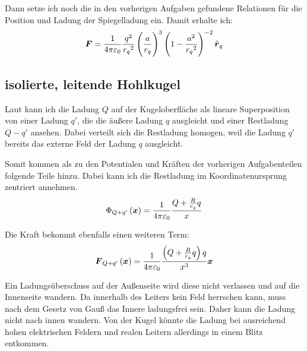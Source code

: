 \documentclass[11pt, ngerman, fleqn]{article}
\renewcommand{\vec}[1]{\boldsymbol{#1}}
\begin{document}
Dann setze ich noch die in den vorherigen Aufgaben gefundene Relationen für die Position und Ladung der Spiegelladung ein. Damit erhalte ich:
\[
	\vec F
	= \frac{1}{4 \pi \varepsilon_0} \frac{q^2}{{r_q}^2} \del{\frac a{r_q}}^3 \del{1-\frac{a^2}{{r_q}^2}}^{-2} \hat{\vec r}_q
\]

\subsection{isolierte, leitende Hohlkugel}

Laut \cite[Seite~75]{jackson-klassische_elektrodynamik} kann ich die Ladung $Q$
auf der Kugeloberfläche als lineare Superposition von einer Ladung $q'$, die
die äußere Ladung $q$ ausgleicht und einer Restladung $Q - q'$ ansehen. Dabei
verteilt sich die Restladung homogen, weil die Ladung $q'$ bereits das externe
Feld der Ladung $q$ ausgleicht.

Somit kommen als zu den Potentialen und Kräften der vorherigen Aufgabenteilen
folgende Teile hinzu. Dabei kann ich die Restladung im Koordinatenursprung
zentriert annehmen.
\[
	\Phi_{Q + q'}\del{\vec x}
	= \frac{1}{4 \pi \varepsilon_0} \frac{Q+\frac R{r_q} q}{x}
\]

Die Kraft bekommt ebenfalls einen weiteren Term:
\[
	\vec F_{Q + q'}\del{\vec x}
	= \frac{1}{4 \pi \varepsilon_0} \frac{\del{Q+\frac R{r_q} q}q}{x^3} \vec x
\]

Ein Ladungsüberschuss auf der Außenseite wird diese nicht verlassen und auf die
Innenseite wandern. Da innerhalb des Leiters kein Feld herrschen kann, muss
nach dem Gesetz von Gauß das Innere ladungsfrei sein. Daher kann die Ladung
nicht nach innen wandern. Von der Kugel könnte die Ladung bei ausreichend hohen
elektrischen Feldern und realen Leitern allerdings in einem Blitz entkommen.



\end{document}
